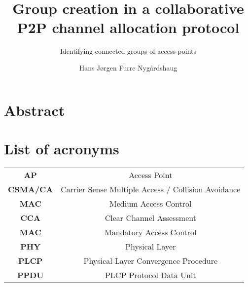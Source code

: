 \documentclass[12pt, a4paper,UKenglish, final]{report}
\title{Group creation in a collaborative P2P channel allocation protocol}
\subtitle{Identifying connected groups of access points}
\author{Hans Jørgen Furre Nygårdshaug}
\begin{document}
\duoforside[dept={Institutt for informatikk},
  program={Informatikk: programmering og nettverk},
  long]
\section*{Abstract}

\clearpage
\section*{List of acronyms}
\begin{tabular}{ c c }
	\textbf{AP} & Access Point\\ 
	\textbf{CSMA/CA} & Carrier Sense Multiple Access / Collision Avoidance\\
	\textbf{MAC} & Medium Access Control\\
	\textbf{CCA} & Clear Channel Assessment\\
	\textbf{MAC} & Mandatory Access Control\\
	\textbf{PHY} & Physical Layer\\
	\textbf{PLCP} & Physical Layer Convergence Procedure\\
	\textbf{PPDU} & PLCP Protocol Data Unit\\
\end{tabular}
\tableofcontents
\listoffigures







%



\printbibliography
\end{document}

